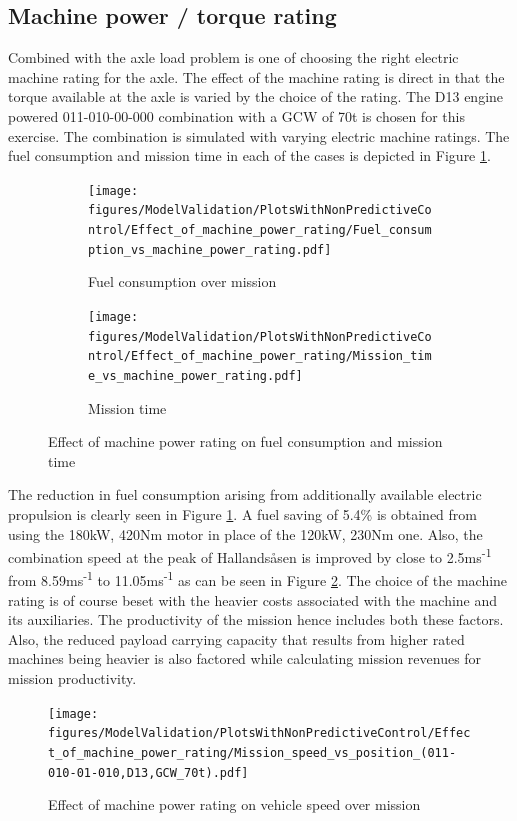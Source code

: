 \documentclass[ExampleMasters.tex]{subfiles}
\begin{document}
\subsection{Machine power / torque rating}
Combined with the axle load problem is one of choosing the right electric machine rating for the axle. The effect of the machine rating is direct in that the torque available at the axle is varied by the choice of the rating. The D13 engine powered 011-010-00-000 combination with a GCW of 70t is chosen for this exercise. The combination is simulated with varying electric machine ratings. The fuel consumption and mission time in each of the cases is depicted in Figure \ref{fuelTimeEngineAxleLoad}.\\
\begin{figure}[h!]
\begin{subfigure}{.5\textwidth}
\centering
\texttt{[image: figures/ModelValidation/PlotsWithNonPredictiveControl/Effect\_of\_machine\_power\_rating/Fuel\_consumption\_vs\_machine\_power\_rating.pdf]}
\caption{Fuel consumption over mission}
\end{subfigure}
\begin{subfigure}{.5\textwidth}
\centering
\texttt{[image: figures/ModelValidation/PlotsWithNonPredictiveControl/Effect\_of\_machine\_power\_rating/Mission\_time\_vs\_machine\_power\_rating.pdf]}
\caption{Mission time}
\end{subfigure}
\caption{Effect of machine power rating on fuel consumption and mission time}
\label{fuelTimeEngineAxleLoad}
\end{figure}
The reduction in fuel consumption arising from additionally available electric propulsion is clearly seen in Figure \ref{fuelTimeEngineAxleLoad}. A fuel saving of 5.4\% is obtained from using the 180kW, 420Nm motor in place of the 120kW, 230Nm one. Also, the combination speed at the peak of Hallands\aa sen is improved by close to 2.5ms\textsuperscript{-1} from 8.59ms\textsuperscript{-1} to 11.05ms\textsuperscript{-1} as can be seen in Figure \ref{speedMissionMachineRating}. The choice of the machine rating is of course beset with the heavier costs associated with the machine and its auxiliaries. The productivity of the mission hence includes both these factors. Also, the reduced payload carrying capacity that results from higher rated machines being heavier is also factored while calculating mission revenues for mission productivity.\\
\begin{figure}[h!]
\centering
\texttt{[image: figures/ModelValidation/PlotsWithNonPredictiveControl/Effect\_of\_machine\_power\_rating/Mission\_speed\_vs\_position\_(011-010-01-010,D13,GCW\_70t).pdf]}
\caption{Effect of machine power rating on vehicle speed over mission}
\label{speedMissionMachineRating}
\end{figure}
\end{document}
